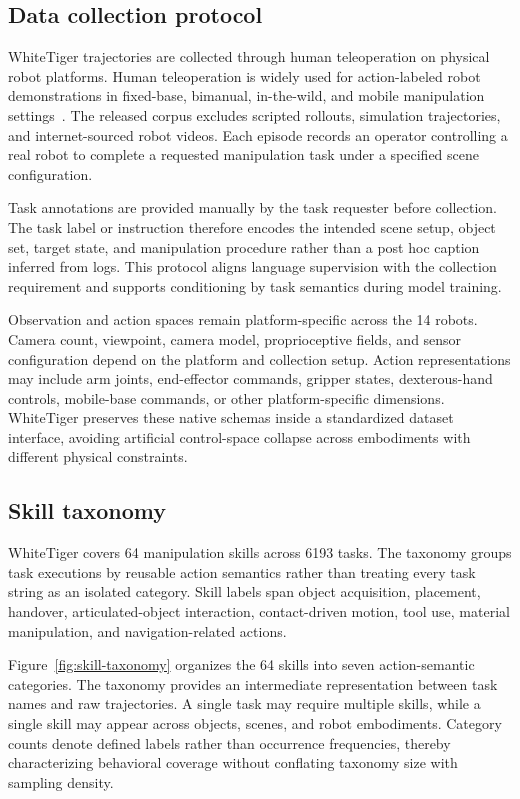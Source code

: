 \subsection{Data collection protocol}

WhiteTiger trajectories are collected through human teleoperation on physical robot platforms. Human teleoperation is widely used for action-labeled robot demonstrations in fixed-base, bimanual, in-the-wild, and mobile manipulation settings~\cite{mandlekar2018roboturk,sharma2018mime,zhao2023aloha,fu2024mobilealoha,khazatsky2024droid}. The released corpus excludes scripted rollouts, simulation trajectories, and internet-sourced robot videos. Each episode records an operator controlling a real robot to complete a requested manipulation task under a specified scene configuration.

Task annotations are provided manually by the task requester before collection. The task label or instruction therefore encodes the intended scene setup, object set, target state, and manipulation procedure rather than a post hoc caption inferred from logs. This protocol aligns language supervision with the collection requirement and supports conditioning by task semantics during model training.

Observation and action spaces remain platform-specific across the 14 robots. Camera count, viewpoint, camera model, proprioceptive fields, and sensor configuration depend on the platform and collection setup. Action representations may include arm joints, end-effector commands, gripper states, dexterous-hand controls, mobile-base commands, or other platform-specific dimensions. WhiteTiger preserves these native schemas inside a standardized dataset interface, avoiding artificial control-space collapse across embodiments with different physical constraints.

\subsection{Skill taxonomy}

WhiteTiger covers 64 manipulation skills across 6193 tasks. The taxonomy groups task executions by reusable action semantics rather than treating every task string as an isolated category. Skill labels span object acquisition, placement, handover, articulated-object interaction, contact-driven motion, tool use, material manipulation, and navigation-related actions.

Figure~\ref{fig:skill-taxonomy} organizes the 64 skills into seven action-semantic categories. The taxonomy provides an intermediate representation between task names and raw trajectories. A single task may require multiple skills, while a single skill may appear across objects, scenes, and robot embodiments. Category counts denote defined labels rather than occurrence frequencies, thereby characterizing behavioral coverage without conflating taxonomy size with sampling density.

